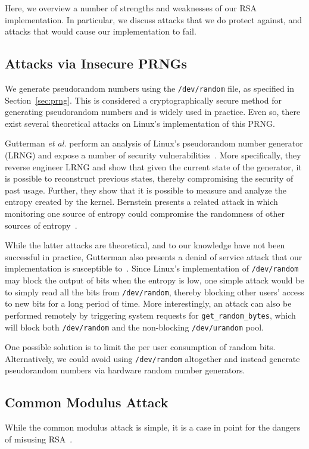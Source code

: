 \documentclass[a4paper]{article}
\begin{document}
Here, we overview a number of strengths and weaknesses of our RSA implementation. In particular, we discuss attacks that we do protect against, and attacks that would cause our implementation to fail.

\subsection{Attacks via Insecure PRNGs}

We generate pseudorandom numbers using the {\tt /dev/random} file, as specified in Section~\ref{sec:prng}. This is considered a cryptographically secure method for generating pseudorandom numbers and is widely used in practice. Even so, there exist several theoretical attacks on Linux's implementation of this PRNG.

Gutterman \emph{et al.} perform an analysis of Linux's pseudorandom number generator (LRNG) and expose a number of security vulnerabilities~\cite{gutterman2006analysis}. More specifically, they reverse engineer LRNG and show that given the current state of the generator, it is possible to reconstruct previous states, thereby compromising the security of past usage. Further, they show that it is possible to measure and analyze the entropy created by the kernel. Bernstein presents a related
attack in which monitoring one source of entropy could compromise the randomness of other sources of entropy~\cite{bernstein2014entropy}.

While the latter attacks are theoretical, and to our knowledge have not been successful in practice, Gutterman also presents a denial of service attack that our implementation is susceptible to~\cite{gutterman2006analysis}. Since Linux's implementation of {\tt /dev/random} may block the output of bits when the entropy is low, one simple attack would be to simply read all the bits from {\tt /dev/random}, thereby blocking other users' access to new bits for a long
period of time. More interestingly, an attack can also be performed remotely by triggering system requests for {\tt get\_random\_bytes}, which will block both {\tt /dev/random} and the non-blocking {\tt /dev/urandom} pool.

One possible solution is to limit the per user consumption of random bits. Alternatively, we could avoid using {\tt /dev/random} altogether and instead generate pseudorandom numbers via hardware random number generators.

\subsection{Common Modulus Attack}
While the common modulus attack is simple, it is a case in point for the dangers of misusing RSA~\cite{boneh1999twenty}.
\end{document}
